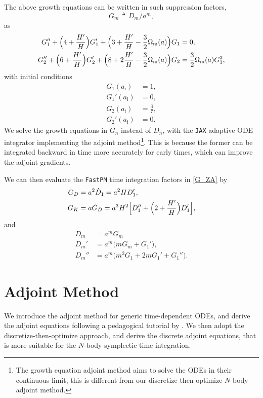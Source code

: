 \documentclass[modern, trackchanges, dvipsnames]{aastex631}
\newcommand{\Omegam}{\Omega_\mathrm{m}}
\newcommand{\ic}{\mathrm{i}}
\begin{document}
The above growth equations can be written in such suppression factors,
\begin{equation}
  G_m \triangleq D_m / a^m,
\end{equation}
as
\begin{align}
  G_1'' + \Bigl( 4 + \frac{H'}H \Bigr) G_1'
  + \Bigl( 3 + \frac{H'}H - \frac32 \Omegam(a) \Bigr) G_1
  &= 0, \nonumber\\
  G_2'' + \Bigl( 6 + \frac{H'}H \Bigr) G_2'
  + \Bigl( 8 + 2\frac{H'}H - \frac32 \Omegam(a) \Bigr) G_2
  &= \frac32 \Omegam(a) G_1^2,
\end{align}
with initial conditions
\begin{align}
    G_1(a_\ic) &= 1, \nonumber\\
    G_1'(a_\ic) &= 0, \nonumber\\
    G_2(a_\ic) &= \frac37, \nonumber\\
    G_2'(a_\ic) &= 0.
\end{align}
We solve the growth equations in $G_n$ instead of $D_n$, with the
\texttt{JAX} adaptive ODE integrator implementing the adjoint
method\footnote{The growth equation adjoint method aims to solve the
ODEs in their continuous limit, this is different from our
discretize-then-optimize $N$-body adjoint method.}.
This is because the former can be integrated backward in time more
accurately for early times, which can improve the adjoint gradients.

We can then evaluate the \texttt{FastPM} time integration factors in
\eqref{G_ZA} by
\begin{align}
  G_D &= a^2 \dot D_1 = a^2 H D_1', \nonumber\\
  G_K &= a \dot G_D = a^3 H^2 \Bigl[
    D_1'' + \Bigl(2 + \frac{H'}H \Bigr) D_1'
  \Bigr],
  \label{G_eval}
\end{align}
and
\begin{align}
  D_m &= a^m G_m \nonumber\\
  D_m' &= a^m \bigl( m G_m + G_1' \Bigr), \nonumber\\
  D_m'' &= a^m \bigl( m^2 G_1 + 2m G_1' + G_1'' \Bigr).
\end{align}


\vspace{1em}
\section{Adjoint Method}
\label{app:adj}

We introduce the adjoint method for generic time-dependent ODEs, and
derive the adjoint equations following a pedagogical tutorial by
\citet{Bradley2019}.
We then adopt the discretize-then-optimize approach, and derive the
discrete adjoint equations, that is more suitable for the $N$-body
symplectic time integration.
\end{document}
